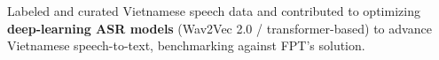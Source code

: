 
\vspace{1pt}
\begin{resume_list}
  \item Labeled and curated Vietnamese speech data and contributed to optimizing \textbf{deep-learning ASR models} (Wav2Vec 2.0 / transformer-based) to advance Vietnamese speech-to-text, benchmarking against FPT's solution.
\end{resume_list}
